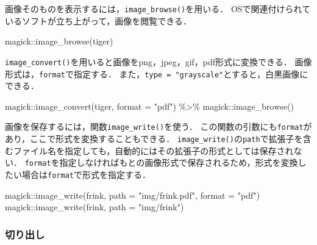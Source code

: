 \documentclass[
]{article}
\newenvironment{Shaded}{\begin{snugshade}}{\end{snugshade}}
\newcommand{\AttributeTok}[1]{\textcolor[rgb]{0.77,0.63,0.00}{#1}}
\newcommand{\FunctionTok}[1]{\textcolor[rgb]{0.00,0.00,0.00}{#1}}
\newcommand{\NormalTok}[1]{#1}
\newcommand{\SpecialCharTok}[1]{\textcolor[rgb]{0.00,0.00,0.00}{#1}}
\newcommand{\StringTok}[1]{\textcolor[rgb]{0.31,0.60,0.02}{#1}}
\begin{document}
画像そのものを表示するには，\texttt{image\_browse()}を用いる．
OSで関連付けられているソフトが立ち上がって，画像を閲覧できる．

\begin{Shaded}
\begin{Highlighting}[]
\NormalTok{magick}\SpecialCharTok{::}\FunctionTok{image\_browse}\NormalTok{(tiger)}
\end{Highlighting}
\end{Shaded}

\texttt{image\_convert()}を用いると画像をpng，jpeg，gif，pdf形式に変換できる．
画像形式は，\texttt{format}で指定する．
また，\texttt{type\ =\ "grayscale"}とすると，白黒画像にできる．

\begin{Shaded}
\begin{Highlighting}[]
\NormalTok{magick}\SpecialCharTok{::}\FunctionTok{image\_convert}\NormalTok{(tiger, }\AttributeTok{format =} \StringTok{"pdf"}\NormalTok{) }\SpecialCharTok{\%\textgreater{}\%}
\NormalTok{  magick}\SpecialCharTok{::}\FunctionTok{image\_browse}\NormalTok{()}
\end{Highlighting}
\end{Shaded}

画像を保存するには，関数\texttt{image\_write()}を使う．
この関数の引数にも\texttt{format}があり，ここで形式を変換することもできる．
\texttt{image\_write()}の\texttt{path}で拡張子を含むファイル名を指定しても，自動的にはその拡張子の形式としては保存されない．
\texttt{format}を指定しなければもとの画像形式で保存されるため，形式を変換したい場合は\texttt{format}で形式を指定する．

\begin{Shaded}
\begin{Highlighting}[]
\NormalTok{magick}\SpecialCharTok{::}\FunctionTok{image\_write}\NormalTok{(frink, }\AttributeTok{path =} \StringTok{"img/frink.pdf"}\NormalTok{, }\AttributeTok{format =} \StringTok{"pdf"}\NormalTok{) }
\NormalTok{magick}\SpecialCharTok{::}\FunctionTok{image\_write}\NormalTok{(frink, }\AttributeTok{path =} \StringTok{"img/frink"}\NormalTok{)}
\end{Highlighting}
\end{Shaded}

\hypertarget{ux5207ux308aux51faux3057}{%
\subsubsection{切り出し}\label{ux5207ux308aux51faux3057}}
\end{document}
